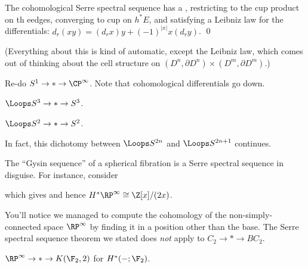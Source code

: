 \begin{corollary}
The cohomological Serre spectral sequence has a , restricting to the cup product on th eedges, converging to cup on $h^* E$, and satisfying a Leibniz law for the differentials: $d_r(x y) = (d_r x) y + (-1)^{|x|} x (d_r y)$. \qed
\end{corollary}

(Everything about this is kind of automatic, except the Leibniz law, which comes out of thinking about the cell structure on $(D^n, \partial D^n) \times (D^m, \partial D^m)$.)

\begin{example}
Re-do $S^1 \to * \to \CP^\infty$.  Note that cohomological differentials go down.
\end{example}

\begin{example}
$\Loops S^3 \to * \to S^3$.
\end{example}

\begin{example}
$\Loops S^2 \to * \to S^2$.
\end{example}

\begin{remark}
In fact, this dichotomy between $\Loops S^{2n}$ and $\Loops S^{2n+1}$ continues.
\end{remark}

\begin{example}
The ``Gysin sequence'' of a spherical fibration is a Serre spectral sequence in disguise.  For instance, consider
\begin{center}
\end{center}
which gives
and hence $H^* \RP^\infty \cong \Z[x]/(2x)$.
\end{example}

\begin{remark}
You'll notice we managed to compute the cohomology of the non-simply-connected space $\RP^\infty$ by finding it in a position other than the base.  The Serre spectral sequence theorem we stated does \emph{not} apply to $C_2 \to * \to BC_2$.
\end{remark}

\begin{example}
$\RP^\infty \to * \to K(\F_2, 2)$ for $H^*(-; \F_2)$.
\end{example}

